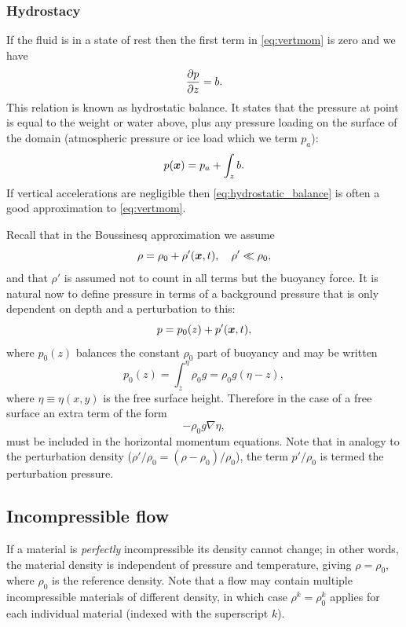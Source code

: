 \subsubsection{Hydrostacy}
If the fluid is in a state of rest then the first term in \eqref{eq:vertmom} is zero and
we have 
\begin{equation}\label{eq:hydrostatic_balance}
\ppx[z]{p} = b.
\end{equation}
This relation is known as hydrostatic balance. It states that the pressure at point
is equal to the weight or water above, plus any pressure loading on the surface of the
domain (\eg atmospheric pressure or ice load which we term $p_a$):
\begin{equation*}
p(\bmx) = p_a + \int_z b.
\end{equation*}
If vertical accelerations are negligible then \eqref{eq:hydrostatic_balance} is
often a good approximation to \eqref{eq:vertmom}.

Recall that in the Boussinesq approximation we assume 
\begin{equation*}
\rho = \rho_0 + \rho'(\bmx,t),\quad \rho'\ll\rho_0,
\end{equation*}
and that $\rho'$ is assumed not to count in all terms but the buoyancy force. 
It is natural now to define pressure in terms of a background pressure that is
only dependent on depth and a perturbation to this:
\begin{equation*}
p=p_0(z)+p'(\bmx,t),
\end{equation*}
where $p_0(z)$ balances the constant $\rho_0$ part of buoyancy and may be written
\begin{equation*}
p_0(z) = \int_z^\eta \rho_0 g = \rho_0 g(\eta - z),
\end{equation*}
where $\eta\equiv\eta(x,y)$ is the free surface height. Therefore in
the case of a free surface an extra term of the form
\begin{equation*}
-\rho_0g\nabla\eta,
\end{equation*}
must be included in the horizontal momentum equations. 
Note that in analogy to the perturbation density ($\rho'/\rho_0 = (\rho-\rho_0)/\rho_0$), the
term $p'/\rho_0$ is termed the perturbation pressure.

\subsection{Incompressible flow}
\label{Sect:IncompressibleFlow}
If a material is \emph{perfectly} incompressible its density cannot change;
in other words, the material density is independent of pressure and
temperature, giving $\rho = \rho_0$, where $\rho_0$ is the reference
density. Note that a flow may contain multiple incompressible materials of
different density, in which case $\rho^k=\rho_0^k$ applies for each
individual material (indexed with the superscript $k$).

